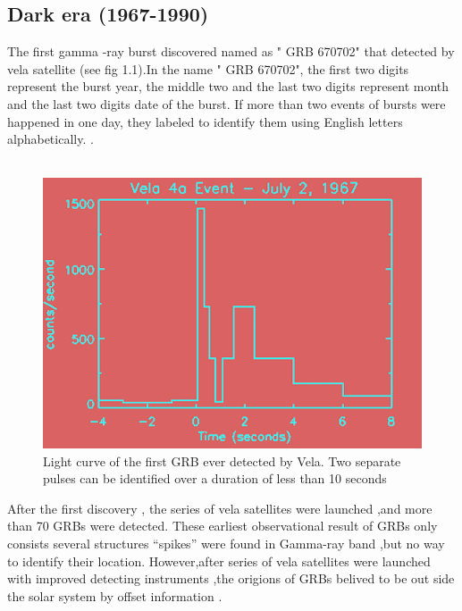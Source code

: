 \subsection{Dark era (1967-1990)}
 The first gamma -ray burst discovered  named as " GRB 670702" that  detected by vela satellite (see fig 1.1).In the name " GRB 670702", the first two digits represent the burst year, the middle two  and the last two digits represent month and the last two digits date of the burst. If more than two events of bursts were happened in one day, they labeled to identify them  using  English letters alphabetically. \citep {4} \citep { 5}.\\\\
\begin{center}
\begin{figure}[h]
\includegraphics[scale=0.2]{Figures/fig1.png}
\caption{Light curve of the first GRB ever detected by Vela. Two separate pulses can be identified over a duration of less than 10 seconds \citep{4}}
\end{figure}
\end{center}
After the first discovery , the series of vela satellites were launched ,and more than 70 GRBs were detected. These earliest observational result of GRBs only consists several structures “spikes” were found in Gamma-ray band ,but no way to identify their location. However,after series of  vela satellites were launched with improved detecting instruments ,the origions of GRBs belived to be out side the solar system by offset information \citep{4} \citep { 5}.\\\\
